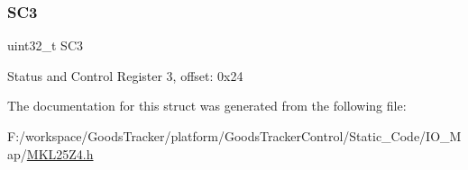 \subsubsection{\texorpdfstring{S\+C3}{SC3}}
{\footnotesize\ttfamily uint32\+\_\+t S\+C3}

Status and Control Register 3, offset\+: 0x24 

The documentation for this struct was generated from the following file\+:\begin{DoxyCompactItemize}
\item 
F\+:/workspace/\+Goods\+Tracker/platform/\+Goods\+Tracker\+Control/\+Static\+\_\+\+Code/\+I\+O\+\_\+\+Map/\hyperlink{_m_k_l25_z4_8h}{M\+K\+L25\+Z4.\+h}\end{DoxyCompactItemize}
